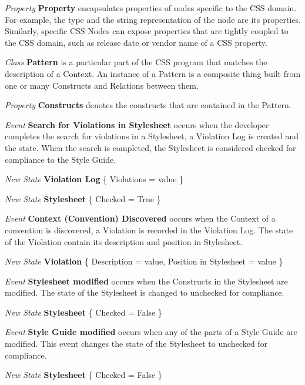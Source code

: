 \documentclass[parskip=full]{uvamscse}
\begin{document}
\begin{description}
\textit{Property} \textbf{Property} encapsulates properties of nodes specific to the CSS domain. For example, the type and the string representation of the node are its properties. Similarly, specific CSS Nodes can expose properties that are tightly coupled to the CSS domain, such as release date or vendor name of a CSS property.


\item\textit{Class} \textbf{Pattern} is a particular part of the CSS program that matches the description of a Context. An instance of a Pattern is a composite thing built from one or many Constructs and Relations between them.

\textit{Property} \textbf{Constructs} denotes the constructs that are contained in the Pattern.


\item\textit{Event} \textbf{Search for Violations in Stylesheet} occurs when the developer completes the search for violations in a Stylesheet, a Violation Log is created and the state. When the search is completed, the Stylesheet is considered checked for compliance to the Style Guide.

\textit{New State} \textbf{Violation Log} \{ Violations = value \}

\textit{New State} \textbf{Stylesheet} \{ Checked = True \}


\item\textit{Event} \textbf{Context (Convention) Discovered} occurs when the Context of a convention is discovered, a Violation is recorded in the Violation Log. The state of the Violation contain its description and position in Stylesheet.

\textit{New State} \textbf{Violation} \{ Description = value, Position in Stylesheet = value \}


\item\textit{Event} \textbf{Stylesheet modified} occurs when the Constructs in the Stylesheet are modified. The state of the Stylesheet is changed to unchecked for compliance.

\textit{New State} \textbf{Stylesheet} \{ Checked = False \}


\item\textit{Event} \textbf{Style Guide modified} occurs when any of the parts of a Style Guide are modified. This event changes the state of the Stylesheet to unchecked for compliance.

\textit{New State} \textbf{Stylesheet} \{ Checked = False \}

\end{description}
\end{document}
